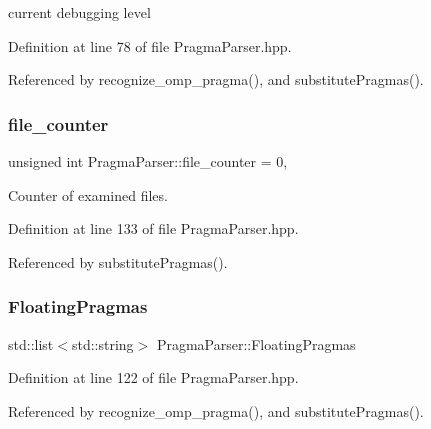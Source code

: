 current debugging level 



Definition at line 78 of file Pragma\+Parser.\+hpp.



Referenced by recognize\+\_\+omp\+\_\+pragma(), and substitute\+Pragmas().

\mbox{\label{classPragmaParser_a9c1104c9516060f9831ba5a3ab724fae}} 
\subsubsection{\texorpdfstring{file\+\_\+counter}{file\_counter}}
{\footnotesize\ttfamily unsigned int Pragma\+Parser\+::file\+\_\+counter = 0\hspace{0.3cm}{\ttfamily [static]}, {\ttfamily [private]}}



Counter of examined files. 



Definition at line 133 of file Pragma\+Parser.\+hpp.



Referenced by substitute\+Pragmas().

\mbox{\label{classPragmaParser_aba0369bb6f32165f81bdea66717484fc}} 
\subsubsection{\texorpdfstring{Floating\+Pragmas}{FloatingPragmas}}
{\footnotesize\ttfamily std\+::list$<$std\+::string$>$ Pragma\+Parser\+::\+Floating\+Pragmas\hspace{0.3cm}{\ttfamily [private]}}



Definition at line 122 of file Pragma\+Parser.\+hpp.



Referenced by recognize\+\_\+omp\+\_\+pragma(), and substitute\+Pragmas().

\mbox{\label{classPragmaParser_aec5893ea5d5f9ed2bab54bdbb5373f60}} 
